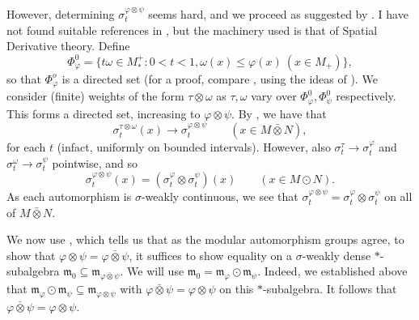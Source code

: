 \documentclass[a4paper,11pt]{article}
\theoremstyle{plain}
\theoremstyle{remark}
\newcommand{\mf}[1]{\mathfrak{#1}}
\newcommand{\vnten}{\bar\otimes}
\begin{document}
However, determining $\sigma_t^{\varphi\otimes\psi}$ seems hard, and we proceed as suggested by \cite{Stratila_ModTheoryBook}.  I have not found suitable references in \cite{TakesakiII}, but the machinery used is that of Spatial Derivative theory.  Define
\[ \Phi^0_\varphi = \{ t\omega\in M_*^+ : 0<t<1, \omega(x) \leq \varphi(x) \ (x\in M_+) \}, \]
so that $\Phi^o_\varphi$ is a directed set (for a proof, compare \cite[Proposition~3.5]{kustermans1997kmsweightscalgebras}, using the ideas of \cite[page~55]{TakesakiII}).  We consider (finite) weights of the form $\tau \otimes \omega$ as $\tau,\omega$ vary over $\Phi^0_\varphi, \Phi^0_\psi$ respectively.  This forms a directed set, increasing to $\varphi\otimes\psi$.  By \cite[Proposition~7.17]{Stratila_ModTheoryBook}, we have that
\[ \sigma_t^{\tau\otimes\omega}(x) \to \sigma_t^{\varphi\otimes\psi} \qquad (x\in M\vnten N), \]
for each $t$ (infact, uniformly on bounded intervals).  However, also $\sigma_t^\tau \to \sigma_t^\varphi$ and $\sigma_t^\omega \to \sigma_t^\psi$ pointwise, and so 
\[ \sigma_t^{\varphi\otimes\psi}(x) = (\sigma_t^\varphi \otimes \sigma_t^\psi)(x)
\qquad (x\in M \odot N). \]
As each automorphism is $\sigma$-weakly continuous, we see that $\sigma_t^{\varphi\otimes\psi} = \sigma_t^\varphi \otimes \sigma_t^\psi$ on all of $M\vnten N$.

We now use \cite[Proposition~VIII.3.16]{TakesakiII}, which tells us that as the modular automorphism groups agree, to show that $\varphi\otimes\psi = \varphi \vnten \psi$, it suffices to show equality on a $\sigma$-weakly dense $*$-subalgebra $\mf m_0 \subseteq \mf m_{\varphi\vnten\psi}$.  We will use $\mf m_0 = \mf m_\varphi \odot \mf m_\psi$.  Indeed, we established above that $\mf m_\varphi \odot \mf m_\psi \subseteq \mf m_{\varphi\otimes\psi}$ with $\varphi\vnten\psi = \varphi\otimes\psi$ on this $*$-subalgebra.  It follows that $\varphi\vnten\psi = \varphi\otimes\psi$.




\end{document}
